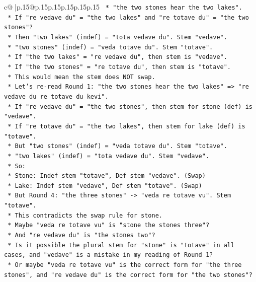 \documentclass{article}
\begin{document}
{\begin{supertabular}{c@{$\;$}|p{.15\linewidth}@{}p{.15\linewidth}p{.15\linewidth}p{.15\linewidth}p{.15\linewidth}p{.15\linewidth}}
{{{\texttt{        *   "the two stones hear the two lakes".} \\
\texttt{        *   If "re vedave du" = "the two lakes" and "re totave du" = "the two stones"?} \\
\texttt{        *   Then "two lakes" (indef) = "tota vedave du". Stem "vedave".} \\
\texttt{        *   "two stones" (indef) = "veda totave du". Stem "totave".} \\
\texttt{        *   If "the two lakes" = "re vedave du", then stem is "vedave".} \\
\texttt{        *   If "the two stones" = "re totave du", then stem is "totave".} \\
\texttt{        *   This would mean the stem does NOT swap.} \\
\texttt{        *   Let's re{-}read Round 1: "the two stones hear the two lakes" => "re vedave du re totave du kevi".} \\
\texttt{        *   If "re vedave du" = "the two stones", then stem for stone (def) is "vedave".} \\
\texttt{        *   If "re totave du" = "the two lakes", then stem for lake (def) is "totave".} \\
\texttt{        *   But "two stones" (indef) = "veda totave du". Stem "totave".} \\
\texttt{        *   "two lakes" (indef) = "tota vedave du". Stem "vedave".} \\
\texttt{        *   So:} \\
\texttt{            *   Stone: Indef stem "totave", Def stem "vedave". (Swap)} \\
\texttt{            *   Lake: Indef stem "vedave", Def stem "totave". (Swap)} \\
\texttt{        *   But Round 4: "the three stones" {-}> "veda re totave vu". Stem "totave".} \\
\texttt{        *   This contradicts the swap rule for stone.} \\
\texttt{        *   Maybe "veda re totave vu" is "stone the stones three"?} \\
\texttt{        *   And "re vedave du" is "the stones two"?} \\
\texttt{        *   Is it possible the plural stem for "stone" is "totave" in all cases, and "vedave" is a mistake in my reading of Round 1?} \\
\texttt{        *   Or maybe "veda re totave vu" is the correct form for "the three stones", and "re vedave du" is the correct form for "the two stones"?} \\
}}}
\end{supertabular}}
\end{document}
